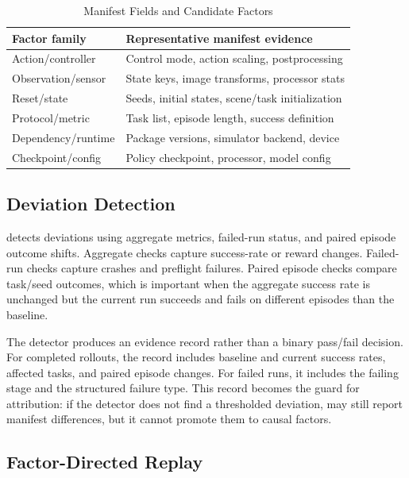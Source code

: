 \begin{table}[!t]
  \caption{Manifest Fields and Candidate Factors}
  \label{tab:manifest-factors}
  \centering
  \footnotesize
  \renewcommand{\arraystretch}{1.08}
  \begin{tabular}{@{}lp{}@{}}
    \toprule
    Factor family & Representative manifest evidence \\
    \midrule
    Action/controller & Control mode, action scaling, postprocessing \\
    Observation/sensor & State keys, image transforms, processor stats \\
    Reset/state & Seeds, initial states, scene/task initialization \\
    Protocol/metric & Task list, episode length, success definition \\
    Dependency/runtime & Package versions, simulator backend, device \\
    Checkpoint/config & Policy checkpoint, processor, model config \\
    \bottomrule
  \end{tabular}
\end{table}

\subsection{Deviation Detection}

\sys detects deviations using aggregate metrics, failed-run status, and paired episode outcome shifts. Aggregate checks capture success-rate or reward changes. Failed-run checks capture crashes and preflight failures. Paired episode checks compare task/seed outcomes, which is important when the aggregate success rate is unchanged but the current run succeeds and fails on different episodes than the baseline.

The detector produces an evidence record rather than a binary pass/fail decision. For completed rollouts, the record includes baseline and current success rates, affected tasks, and paired episode changes. For failed runs, it includes the failing stage and the structured failure type. This record becomes the guard for attribution: if the detector does not find a thresholded deviation, \sys may still report manifest differences, but it cannot promote them to causal factors.

\subsection{Factor-Directed Replay}

